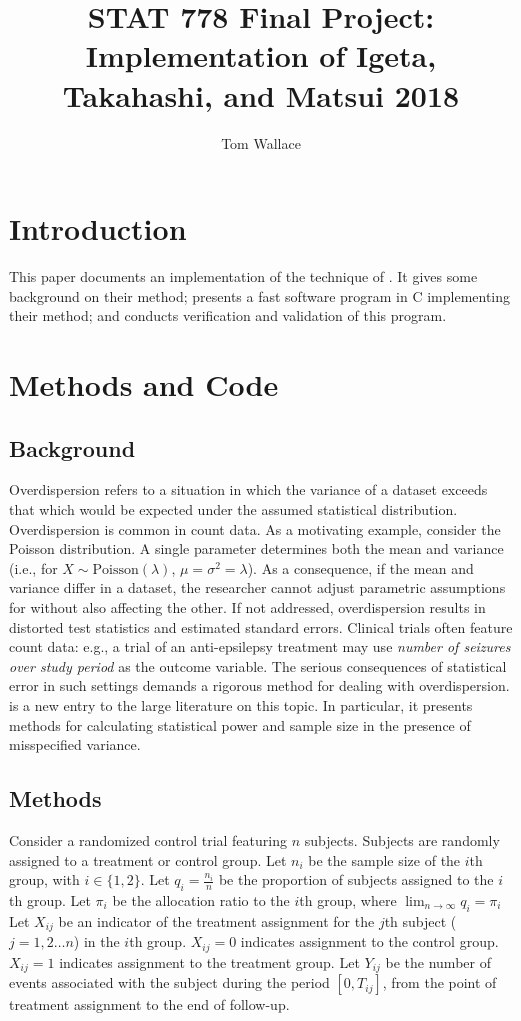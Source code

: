 \documentclass{article}
\author{Tom Wallace}
\title{STAT 778 Final Project: Implementation of Igeta, Takahashi, and Matsui
2018}
\begin{document}
\maketitle

\section{Introduction}
This paper documents an implementation of the technique of \cite{igeta2018}. It
gives some background on their method; presents a fast software program in C
implementing their method; and conducts verification and validation of this
program.

\section{Methods and Code}

\subsection{Background}

Overdispersion refers to a situation in which the variance of a dataset exceeds
that which would be expected under the assumed statistical distribution. 
Overdispersion is common in count data. As a motivating example, consider the
Poisson distribution. A single parameter determines both the 
mean and variance (i.e., for $X \sim \mathrm{Poisson}(\lambda)$, $\mu =
\sigma^2 = \lambda$). As a consequence, if the mean and variance
differ in a dataset, the researcher cannot adjust parametric assumptions for 
without also affecting the other. If not addressed, 
overdispersion results in distorted test statistics and estimated
standard errors. Clinical trials often feature count data: e.g., a trial of an
anti-epsilepsy treatment may use \textit{number of seizures over study period} as the outcome
variable. The serious consequences of statistical error in such settings demands
a rigorous method for dealing with overdispersion. \cite{igeta2018} is a new
entry to the large literature on this topic. In particular, it presents methods
for calculating statistical power and sample size in the presence of
misspecified variance.

\subsection{Methods}

Consider a randomized control trial featuring $n$ subjects. Subjects are
randomly assigned to a treatment or control group. Let $n_i$ be the sample size
of the $i$th group, with $i \in \{1, 2\}$.
Let $q_i = \frac{n_i}{n}$ be the proportion of subjects assigned to
the $i$th group. Let $\pi_i$ be the allocation ratio to the $i$th group, where
$\lim_{n \to \infty} q_i = \pi_i$
Let $X_{ij}$ be an indicator of the treatment assignment for the $j$th subject
($j=1,2\ldots n$) in the $i$th group. $X_{ij}=0$ indicates
assignment to the control group. $X_{ij}=1$ indicates assignment to the
treatment group. Let $Y_{ij}$ be the number of events associated with the subject
during the period $[0, T_{ij}]$, from the point of treatment assignment to the
end of follow-up.
\end{document}
